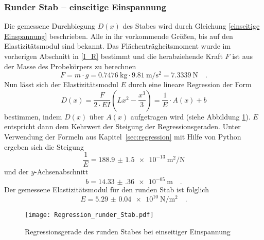 \subsubsection{Runder Stab -- einseitige Einspannung}
Die gemessene Durchbiegung $D(x)$ des Stabes wird durch Gleichung \eqref{einseitige Einspannung} beschrieben.
Alle in ihr vorkommende Größen, bis auf den Elastizitätsmodul sind bekannt. Das Flächenträgheitsmoment wurde im vorherigen Abschnitt in \eqref{I_R} bestimmt und die herabziehende Kraft $F$ ist aus der Masse des Probekörpers zu berechnen
\begin{equation}
  F = m \cdot g = \SI{0.7476}{\kilo\gram} \cdot \SI{9.81}{\metre\per\second\squared} = \SI{7.3339}{\newton} \quad .
\end{equation}
Nun lässt sich der Elastizitätsmodul $E$ durch eine lineare Regression der Form
\begin{equation}
  D(x) = \frac{F}{2\cdot E I}\left(Lx^2-\frac{x^3}{3}\right) = \frac{1}{E} \cdot A(x) +b
\end{equation}
bestimmen, indem $D(x)$ über $A(x)$ aufgetragen wird (siehe Abbildung \ref{fig:Regression_runder_Stab}). $E$ entspricht dann dem Kehrwert der Steigung der Regressionsgeraden. Unter Verwendung der Formeln aus Kapitel~\ref{sec:regression} mit Hilfe von Python ergeben sich die Steigung
\begin{equation}
  \frac{1}{E}= \SI{188.9(15)e-13}{\metre\squared\per\newton}
\end{equation}
und der $y$-Achsenabschnitt
\begin{equation}
  b = \SI{14.33(36)e-05}{\metre} \quad.
\end{equation}
Der gemessene Elastizitätsmodul für den runden Stab ist folglich
\begin{equation}
  E = \SI{5.29(4)e+10}{\newton\per\metre\squared} \quad.
\end{equation}

\begin{figure}[h!]
\centering
\texttt{[image: Regression\_runder\_Stab.pdf]}
\caption{Regressionsgerade des runden Stabes bei einseitiger Einspannung}
\label{fig:Regression_runder_Stab}
\end{figure}



